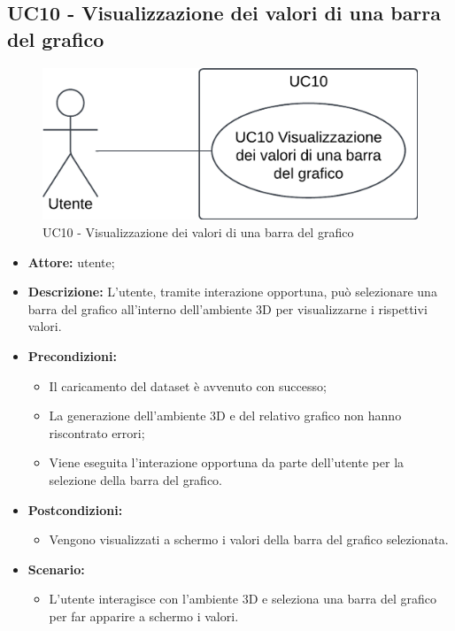 \subsection{UC10 - Visualizzazione dei valori di una barra del grafico}
\begin{figure}[h!]\centering
    \includegraphics[scale=0.7]{template/images/UC10.png}
    \caption{UC10 - Visualizzazione dei valori di una barra del grafico}
\end{figure}
\begin{itemize}    
    \item \textbf{Attore:} utente;
    \item \textbf{Descrizione:} L'utente, tramite interazione opportuna, può selezionare una barra del grafico all'interno dell'ambiente 3D per visualizzarne i rispettivi valori.
    \item \textbf{Precondizioni:}    
        \begin{itemize}
            \item Il caricamento del dataset è avvenuto con successo;
            \item La generazione dell'ambiente 3D e del relativo grafico non hanno riscontrato errori;
            \item Viene eseguita l'interazione opportuna da parte dell'utente per la selezione della barra del grafico.
        \end{itemize}    
    \item \textbf{Postcondizioni:}
        \begin{itemize}
            \item Vengono visualizzati a schermo i valori della barra del grafico selezionata.
        \end{itemize}    
    \item \textbf{Scenario:} 
        \begin{itemize}
            \item L'utente interagisce con l'ambiente 3D e seleziona una barra del grafico per far apparire a schermo i valori.
        \end{itemize}
\end{itemize}

